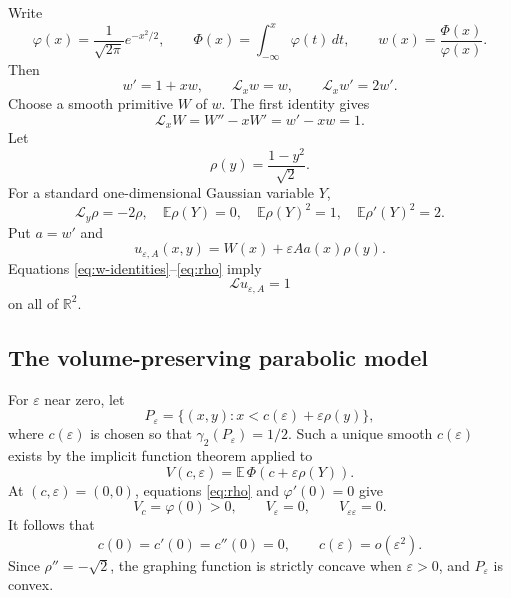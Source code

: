 \documentclass[11pt]{article}
\newcommand{\R}{\mathbb R}
\newcommand{\eps}{\varepsilon}
\newcommand{\cL}{\mathcal L}
\begin{document}
Write
\[
 \varphi(x)=\frac{1}{\sqrt{2\pi}}e^{-x^2/2},
 \qquad
 \Phi(x)=\int_{-\infty}^x\varphi(t)\,dt,
 \qquad
 w(x)=\frac{\Phi(x)}{\varphi(x)}.
\]
Then
\begin{equation}\label{eq:w-identities}
 w'=1+xw,
 \qquad \cL_xw=w,
 \qquad \cL_xw'=2w'.
\end{equation}
Choose a smooth primitive $W$ of $w$.  The first identity gives
\begin{equation}\label{eq:particular}
 \cL_xW=W''-xW'=w'-xw=1.
\end{equation}
Let
\[
 \rho(y)=\frac{1-y^2}{\sqrt2}.
\]
For a standard one-dimensional Gaussian variable $Y$,
\begin{equation}\label{eq:rho}
 \cL_y\rho=-2\rho,
 \quad
 \mathbb E\rho(Y)=0,
 \quad
 \mathbb E\rho(Y)^2=1,
 \quad
 \mathbb E\rho'(Y)^2=2.
\end{equation}
Put $a=w'$ and
\begin{equation}\label{eq:u-eps}
 u_{\eps,A}(x,y)=W(x)+\eps A a(x)\rho(y).
\end{equation}
Equations \eqref{eq:w-identities}--\eqref{eq:rho} imply
\begin{equation}\label{eq:constant-source}
 \cL u_{\eps,A}=1
\end{equation}
on all of $\R^2$.

\subsection*{The volume-preserving parabolic model}

For $\eps$ near zero, let
\[
 P_\eps=\{(x,y):x<c(\eps)+\eps\rho(y)\},
\]
where $c(\eps)$ is chosen so that $\gamma_2(P_\eps)=1/2$.  Such a unique
smooth $c(\eps)$ exists by the implicit function theorem applied to
\[
 V(c,\eps)=\mathbb E\,\Phi(c+\eps\rho(Y)).
\]
At $(c,\eps)=(0,0)$, equations \eqref{eq:rho} and
$\varphi'(0)=0$ give
\[
 V_c=\varphi(0)>0,
 \qquad V_\eps=0,
 \qquad V_{\eps\eps}=0.
\]
It follows that
\begin{equation}\label{eq:c-small}
 c(0)=c'(0)=c''(0)=0,
 \qquad c(\eps)=o(\eps^2).
\end{equation}
Since $\rho''=-\sqrt2$, the graphing function is strictly concave when
$\eps>0$, and $P_\eps$ is convex.
\end{document}
